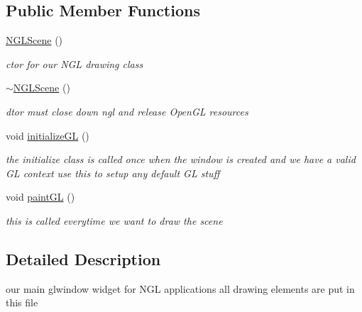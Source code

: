 \subsection*{Public Member Functions}
\begin{DoxyCompactItemize}
\item 
\hyperlink{classNGLScene_a1bed6be9823459aeb1e58af2464ba633}{N\+G\+L\+Scene} ()
\begin{DoxyCompactList}\small\item\em ctor for our N\+GL drawing class \end{DoxyCompactList}\item 
\hyperlink{classNGLScene_abda05d130945833bfbb6bad8d619f7f5}{$\sim$\+N\+G\+L\+Scene} ()\hypertarget{classNGLScene_abda05d130945833bfbb6bad8d619f7f5}{}\label{classNGLScene_abda05d130945833bfbb6bad8d619f7f5}

\begin{DoxyCompactList}\small\item\em dtor must close down ngl and release Open\+GL resources \end{DoxyCompactList}\item 
void \hyperlink{classNGLScene_aab2b866db534d286a56cc2240ed98790}{initialize\+GL} ()\hypertarget{classNGLScene_aab2b866db534d286a56cc2240ed98790}{}\label{classNGLScene_aab2b866db534d286a56cc2240ed98790}

\begin{DoxyCompactList}\small\item\em the initialize class is called once when the window is created and we have a valid GL context use this to setup any default GL stuff \end{DoxyCompactList}\item 
void \hyperlink{classNGLScene_a37bec65bfba7b7a717d803d369221e2d}{paint\+GL} ()\hypertarget{classNGLScene_a37bec65bfba7b7a717d803d369221e2d}{}\label{classNGLScene_a37bec65bfba7b7a717d803d369221e2d}

\begin{DoxyCompactList}\small\item\em this is called everytime we want to draw the scene \end{DoxyCompactList}\end{DoxyCompactItemize}


\subsection{Detailed Description}
our main glwindow widget for N\+GL applications all drawing elements are put in this file 

